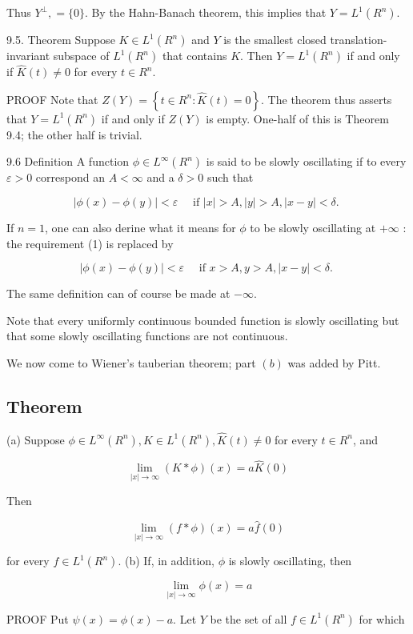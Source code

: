 \documentclass[10pt]{article}
\begin{document}
Thus $Y^{\perp},=\{0\}$. By the Hahn-Banach theorem, this implies that $Y=L^{1}\left(R^{n}\right)$.

9.5. Theorem Suppose $K \in L^{1}\left(R^{n}\right)$ and $Y$ is the smallest closed translation-invariant subspace of $L^{1}\left(R^{n}\right)$ that contains $K$. Then $Y=L^{1}\left(R^{n}\right)$ if and only if $\hat{K}(t) \neq 0$ for every $t \in R^{n}$.

PROOF Note that $Z(Y)=\left\{t \in R^{n}: \hat{K}(t)=0\right\}$. The theorem thus asserts that $Y=L^{1}\left(R^{n}\right)$ if and only if $Z(Y)$ is empty. One-half of this is Theorem 9.4; the other half is trivial.

9.6 Definition A function $\phi \in L^{\infty}\left(R^{n}\right)$ is said to be slowly oscillating if to every $\varepsilon>0$ correspond an $A<\infty$ and a $\delta>0$ such that

$$
|\phi(x)-\phi(y)|<\varepsilon \quad \text { if }|x|>A,|y|>A,|x-y|<\delta \text {. }
$$

If $n=1$, one can also derine what it means for $\phi$ to be slowly oscillating at $+\infty$ : the requirement (1) is replaced by

$$
|\phi(x)-\phi(y)|<\varepsilon \quad \text { if } x>A, y>A,|x-y|<\delta \text {. }
$$

The same definition can of course be made at $-\infty$.

Note that every uniformly continuous bounded function is slowly oscillating but that some slowly oscillating functions are not continuous.

We now come to Wiener's tauberian theorem; part $(b)$ was added by Pitt.

\subsection{Theorem}
(a) Suppose $\phi \in L^{\infty}\left(R^{n}\right), K \in L^{1}\left(R^{n}\right), \widehat{K}(t) \neq 0$ for every $t \in R^{n}$, and

$$
\lim _{|x| \rightarrow \infty}(K * \phi)(x)=a \hat{K}(0)
$$

Then

$$
\lim _{|x| \rightarrow \infty}(f * \phi)(x)=a \hat{f}(0)
$$

for every $f \in L^{1}\left(R^{n}\right)$.
(b) If, in addition, $\phi$ is slowly oscillating, then

$$
\lim _{|x| \rightarrow \infty} \phi(x)=a
$$

PROOF Put $\psi(x)=\phi(x)-a$. Let $Y$ be the set of all $f \in L^{1}\left(R^{n}\right)$ for which
\end{document}
